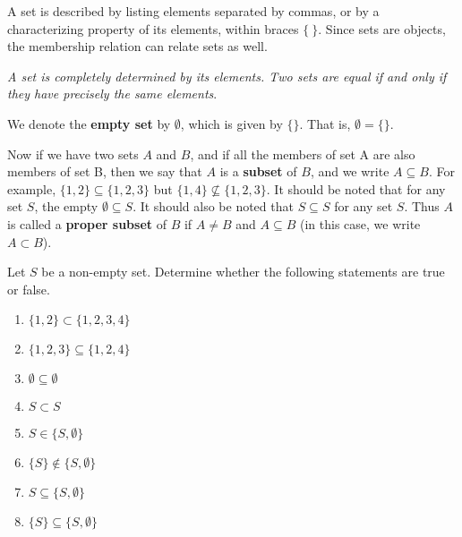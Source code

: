 A set is described by listing elements separated by commas, or by a characterizing property of its elements, within braces $\{ \ \}$. Since sets are objects, the membership relation can relate sets as well.

\textit{A set is completely determined by its elements. Two sets are equal if and only if they have precisely the same elements}.

We denote the \textbf{empty set} by $\emptyset$, which is given by $\{\}$. That is, $\emptyset = \{\}$.

Now if we have two sets $A$ and $B$, and if all the members of set A are also members of set B, then we say that $A$ is a \textbf{subset} of $B$, and we write $A \subseteq B$. For example, $\{1, 2\} \subseteq \{1, 2, 3\}$ but $\{1, 4\} \not\subseteq \{1, 2, 3\}$. It should be noted that for any set $S$, the empty $\emptyset \subseteq S$. It should also be noted that $S \subseteq S$ for any set $S$. Thus $A$ is called a \textbf{proper subset} of $B$ if $A \neq B$ and $A \subseteq B$ (in this case, we write $A \subset B$).

\begin{exercise}
    Let $S$ be a non-empty set. Determine whether the following statements are true or false.

    \begin{multicols}{2}
        \begin{enumerate}[label=(\alph*)]
            \item $\{1, 2\} \subset \{1, 2, 3, 4\}$
            \item $\{1, 2, 3\} \subseteq \{1, 2, 4\}$
            \item $\emptyset \subseteq \emptyset$
            \item $S \subset S$
            \item $S \in \{S, \emptyset\}$
            \item $\{S\} \notin \{S, \emptyset\}$
            \item $S \subseteq \{S, \emptyset\}$
            \item $\{S\} \subseteq \{S, \emptyset\}$
        \end{enumerate}
    \end{multicols}
\end{exercise}


